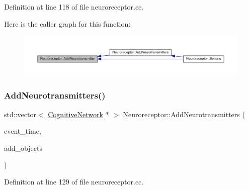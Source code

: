 Definition at line 118 of file neuroreceptor.\+cc.

Here is the caller graph for this function\+:\nopagebreak
\begin{figure}[H]
\begin{center}
\leavevmode
\includegraphics[width=350pt]{class_neuroreceptor_a900b21f6feb6334d4ff8a3fd5244bf05_icgraph}
\end{center}
\end{figure}
\mbox{\label{class_neuroreceptor_a2e4cbd9debd555091923f57f8aa11fe4}} 
\subsubsection{\texorpdfstring{Add\+Neurotransmitters()}{AddNeurotransmitters()}}
{\footnotesize\ttfamily std\+::vector$<$ \hyperlink{class_cognitive_network}{Cognitive\+Network} $\ast$ $>$ Neuroreceptor\+::\+Add\+Neurotransmitters (\begin{DoxyParamCaption}\item[{std\+::chrono\+::time\+\_\+point$<$ \hyperlink{universe_8h_a0ef8d951d1ca5ab3cfaf7ab4c7a6fd80}{Clock} $>$}]{event\+\_\+time,  }\item[{std\+::vector$<$ \hyperlink{class_cognitive_network}{Cognitive\+Network} $\ast$$>$}]{add\+\_\+objects }\end{DoxyParamCaption})}



Definition at line 129 of file neuroreceptor.\+cc.

